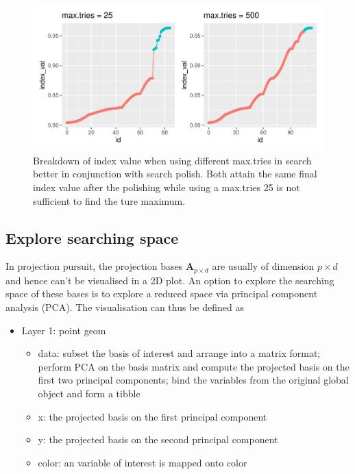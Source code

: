 \documentclass[12pt]{article}
\providecommand{\tightlist}{%
  \setlength{\itemsep}{0pt}\setlength{\parskip}{0pt}}
\begin{document}
\begin{figure}
\centering
\includegraphics{paper_files/figure-latex/polish-1.pdf}
\caption{\label{trace-compare}Breakdown of index value when using
different max.tries in search better in conjunction with search polish.
Both attain the same final index value after the polishing while using a
max.tries 25 is not sufficient to find the ture maximum.}
\end{figure}

\newpage

\hypertarget{animated}{%
\subsection{Explore searching space}\label{animated}}

In projection pursuit, the projection bases \(\mathbf{A}_{p \times d}\)
are usually of dimension \(p \times d\) and hence can't be visualised in
a 2D plot. An option to explore the searching space of these bases is to
explore a reduced space via principal component analysis (PCA). The
visualisation can thus be defined as

\begin{itemize}
\tightlist
\item
  Layer 1: point geom

  \begin{itemize}
  \tightlist
  \item
    data: subset the basis of interest and arrange into a matrix format;
    perform PCA on the basis matrix and compute the projected basis on
    the first two principal components; bind the variables from the
    original global object and form a tibble
  \item
    x: the projected basis on the first principal component
  \item
    y: the projected basis on the second principal component
  \item
    color: an variable of interest is mapped onto color
  \end{itemize}
\end{itemize}
\end{document}
